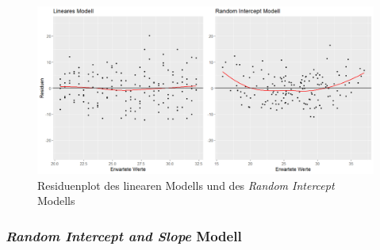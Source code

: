 \documentclass[12pt]{article}\usepackage[]{graphicx}\usepackage[]{color}
\begin{document}
\begin{figure}[t!]
\centering
\includegraphics[width = \textwidth]{residuen_lm_rim}
\caption{Residuenplot des linearen Modells und des \textit{Random Intercept} Modells}
\label{fig:resid_lm_rim}
\end{figure}

\subsubsection{\textit{Random Intercept and Slope} Modell} \label{section:random_intercept_slope_model}
\end{document}
